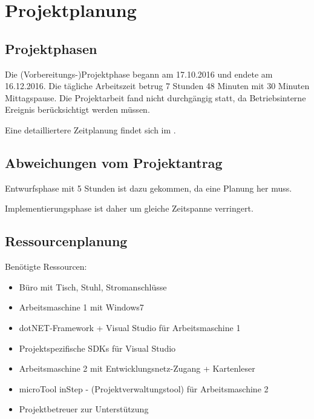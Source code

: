
\newpage
\section{Projektplanung} 
\label{sec:Projektplanung}


\subsection{Projektphasen}
\label{sec:Projektphasen}

Die (Vorbereitungs-)Projektphase begann am 17.10.2016 und endete am 16.12.2016.
Die tägliche Arbeitszeit betrug 7 Stunden 48 Minuten mit 30 Minuten Mittagspause.
Die Projektarbeit fand nicht durchgängig statt, da Betriebsinterne Ereignis berücksichtigt werden müssen.


Eine detailliertere Zeitplanung findet sich im .

\subsection{Abweichungen vom Projektantrag}
\label{sec:AbweichungenProjektantrag}

Entwurfsphase mit 5 Stunden ist dazu gekommen, da eine Planung her muss.

Implementierungsphase ist daher um gleiche Zeitspanne verringert.  %

\subsection{Ressourcenplanung}
\label{sec:Ressourcenplanung}

Benötigte Ressourcen: %
\begin{itemize}
	\item Büro mit Tisch, Stuhl, Stromanschlüsse
	
	\item Arbeitsmaschine 1 mit Windows7
	\item dotNET-Framework + Visual Studio für Arbeitsmaschine 1
	\item Projektspezifische \acs{SDK}s für Visual Studio
	
	\item Arbeitsmaschine 2 mit Entwicklungsnetz-Zugang + Kartenleser
	\item microTool inStep - (Projektverwaltungstool) für Arbeitsmaschine 2
	
	\item Projektbetreuer zur Unterstützung
\end{itemize}

